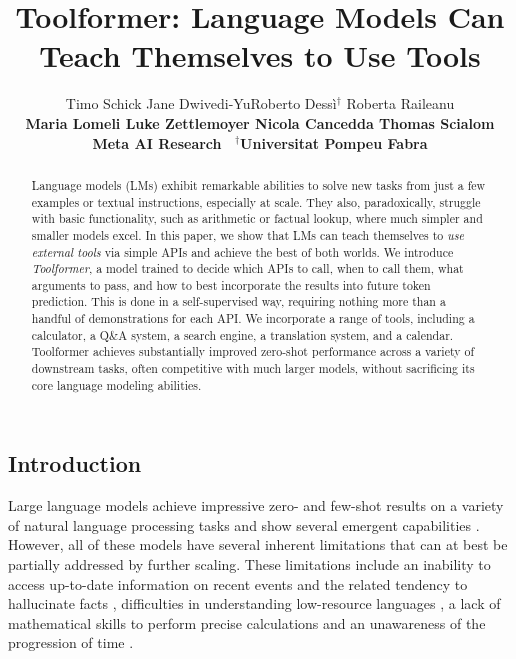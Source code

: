 \documentclass[11pt]{article}
\title{Toolformer: Language Models Can Teach Themselves to Use Tools}
\author{Timo Schick \quad Jane Dwivedi-Yu\quad Roberto Dess\`i$^\dagger$ \quad Roberta Raileanu \\[4pt]
\bf Maria Lomeli \quad Luke Zettlemoyer \quad Nicola Cancedda \quad Thomas Scialom
\\[8pt]
Meta AI Research \
$^{\dagger}$Universitat Pompeu Fabra
}
\newcommand{\ours}[0]{Toolformer}
\begin{document}
\begin{CJK*}{UTF8}{gbsn}
\maketitle

\begin{abstract} 
Language models (LMs) exhibit remarkable abilities to solve new tasks from just a few examples or textual instructions, especially at scale. They also, paradoxically, struggle with basic functionality, such as arithmetic or factual lookup, where much simpler and smaller models excel. In this paper, we show that LMs can teach themselves to \emph{use external tools} via simple APIs and achieve the best of both worlds. We introduce \emph{\ours{}}, a model trained to decide which APIs to call, when to call them, what arguments to pass, and how to best incorporate the results into future token prediction. This is done in a self-supervised way, requiring nothing more than a handful of demonstrations for each API.
We incorporate a range of tools, including a calculator, a Q\&A system, a search engine, a translation system, and a calendar. 
\ours{} achieves substantially improved zero-shot performance across a variety of downstream tasks, often competitive with much larger models, without sacrificing its core language modeling abilities.
\end{abstract}

\section{Introduction}

Large language models achieve impressive zero- and few-shot results on a variety of natural language processing tasks \citep[][i.a.]{brown2020language,chowdhery2022palm} and show several emergent capabilities \citep{wei2022emergent}. However, all of these models have several inherent limitations that can at best be partially addressed by further scaling. These limitations include an inability to access up-to-date information on recent events \citep{komeili-etal-2022-internet} and the related tendency to hallucinate facts \citep{maynez2020faithfulness,ji2022survey}, difficulties in understanding low-resource languages \citep{lin2021fewshot}, a lack of mathematical skills to perform precise calculations \citep{patel-etal-2021-nlp} and an unawareness of the progression of time \citep{dhingra-etal-2022-time}.


\end{CJK*}
\end{document}
